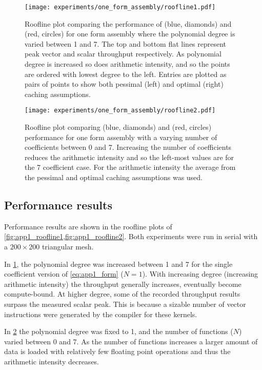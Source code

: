 \documentclass[thesis]{subfiles}
\begin{document}
\begin{figure}
  \centering
  \texttt{[image: experiments/one\_form\_assembly/roofline1.pdf]}
  \caption{
    Roofline plot comparing the performance of  (blue, diamonds) and  (red, circles) for one form assembly where the polynomial degree is varied between 1 and 7.
    The top and bottom flat lines represent peak vector and scalar throughput respectively.
    As polynomial degree is increased so does arithmetic intensity, and so the points are ordered with lowest degree to the left.
    Entries are plotted as pairs of points to show both pessimal (left) and optimal (right) caching assumptions.
  }
  \label{fig:app1_roofline1}
\end{figure}

\begin{figure}
  \centering
  \texttt{[image: experiments/one\_form\_assembly/roofline2.pdf]}
  \caption{
    Roofline plot comparing  (blue, diamonds) and  (red, circles) performance for one form assembly with a varying number of coefficients between 0 and 7.
    Increasing the number of coefficients reduces the arithmetic intensity and so the left-most values are for the 7 coefficient case.
    For the arithmetic intensity the average from the pessimal and optimal caching assumptions was used.
  }
  \label{fig:app1_roofline2}
\end{figure}

\subsection{Performance results}

Performance results are shown in the roofline plots of \cref{fig:app1_roofline1,fig:app1_roofline2}.
Both experiments were run in serial with a $200 \times 200$ triangular mesh.

In \cref{fig:app1_roofline1}, the polynomial degree was increased between 1 and 7 for the single coefficient version of \cref{eq:app1_form} ($N=1$).
With increasing degree (increasing arithmetic intensity) the throughput generally increases, eventually become compute-bound.
At higher degree, some of the recorded throughput results surpass the measured scalar peak.
This is because a sizable number of vector instructions were generated by the compiler for these kernels.

In \cref{fig:app1_roofline2} the polynomial degree was fixed to 1, and the number of functions ($N$) varied between 0 and 7.
As the number of functions increases a larger amount of data is loaded with relatively few floating point operations and thus the arithmetic intensity decreases.
\end{document}
